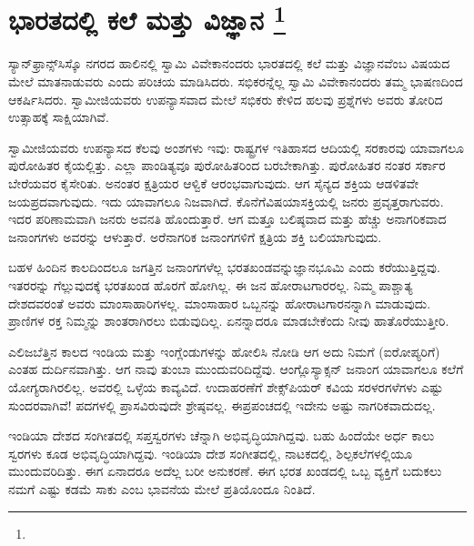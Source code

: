 
\chapter[ಭಾರತದಲ್ಲಿ ಕಲೆ ಮತ್ತು ವಿಜ್ಞಾನ ]{ಭಾರತದಲ್ಲಿ ಕಲೆ ಮತ್ತು ವಿಜ್ಞಾನ \protect\footnote{}}

ಸ್ಯಾನ್​ಫ್ರಾನ್ಸ್​ಸಿಸ್ಕೊ ನಗರದ ಹಾಲಿನಲ್ಲಿ ಸ್ವಾಮಿ ವಿವೇಕಾನಂದರು ಭಾರತದಲ್ಲಿ ಕಲೆ ಮತ್ತು ವಿಜ್ಞಾನವೆಂಬ ವಿಷಯದ ಮೇಲೆ ಮಾತನಾಡುವರು ಎಂದು ಪರಿಚಯ ಮಾಡಿಸಿದರು. ಸಭಿಕರನ್ನೆಲ್ಲ ಸ್ವಾಮಿ ವಿವೇಕಾನಂದರು ತಮ್ಮ ಭಾಷಣದಿಂದ ಆಕರ್ಷಿಸಿದರು. ಸ್ವಾಮೀಜಿಯವರು ಉಪನ್ಯಾಸವಾದ ಮೇಲೆ ಸಭಿಕರು ಕೇಳಿದ ಹಲವು ಪ್ರಶ್ನೆಗಳು ಅವರು ತೋರಿದ ಉತ್ಸಾಹಕ್ಕೆ ಸಾಕ್ಷಿಯಾಗಿವೆ.

ಸ್ವಾಮೀಜಿಯವರು ಉಪನ್ಯಾಸದ ಕೆಲವು ಅಂಶಗಳು ಇವು: ರಾಷ್ಟ್ರಗಳ ಇತಿಹಾಸದ ಆದಿಯಲ್ಲಿ ಸರಕಾರವು ಯಾವಾಗಲೂ ಪುರೋಹಿತರ ಕೈಯಲ್ಲಿತ್ತು. ಎಲ್ಲಾ ಪಾಂಡಿತ್ಯವೂ ಪುರೋಹಿತರಿಂದ ಬರಬೇಕಾಗಿತ್ತು. ಪುರೋಹಿತರ ನಂತರ ಸರ್ಕಾರ ಬೇರೆಯವರ ಕೈಸೇರಿತು. ಅನಂತರ ಕ್ಷತ್ರಿಯರ ಆಳ್ವಿಕೆ ಆರಂಭವಾಗುವುದು. ಆಗ ಸೈನ್ಯದ ಶಕ್ತಿಯ ಆಡಳಿತವೇ ಜಯಪ್ರದವಾಗುವುದು. ಇದು ಯಾವಾಗಲೂ ನಿಜವಾಗಿದೆ. ಕೊನೆಗೆ\break ವಿಷಯಾಸಕ್ತಿಯಲ್ಲಿ ಜನರು ಪ್ರವೃತ್ತರಾಗುವರು. ಇದರ ಪರಿಣಾಮವಾಗಿ ಜನರು ಅವನತಿ ಹೊಂದುತ್ತಾರೆ. ಆಗ ಮತ್ತೂ ಬಲಿಷ್ಠವಾದ ಮತ್ತು ಹೆಚ್ಚು ಅನಾಗರಿಕವಾದ ಜನಾಂಗಗಳು ಅವರನ್ನು ಆಳುತ್ತಾರೆ. ಅರೆನಾಗರಿಕ ಜನಾಂಗಗಳಿಗೆ ಕ್ಷತ್ರಿಯ ಶಕ್ತಿ ಬಲಿಯಾಗುವುದು.

ಬಹಳ ಹಿಂದಿನ ಕಾಲದಿಂದಲೂ ಜಗತ್ತಿನ ಜನಾಂಗಗಳೆಲ್ಲ ಭರತಖಂಡವನ್ನು\break ಜ್ಞಾನಭೂಮಿ ಎಂದು ಕರೆಯುತ್ತಿದ್ದವು. ಇತರರನ್ನು ಗೆಲ್ಲುವುದಕ್ಕೆ ಭರತಖಂಡ ಹೊರಗೆ ಹೋಗಿಲ್ಲ. ಈ ಜನ ಹೋರಾಟಗಾರರಲ್ಲ. ನಿಮ್ಮ ಪಾಶ್ಚಾತ್ಯ ದೇಶದವರಂತೆ ಅವರು ಮಾಂಸಾಹಾರಿಗಳಲ್ಲ. ಮಾಂಸಾಹಾರ ಒಬ್ಬನನ್ನು ಹೋರಾಟಗಾರನನ್ನಾಗಿ ಮಾಡುವುದು. ಪ್ರಾಣಿಗಳ ರಕ್ತ ನಿಮ್ಮನ್ನು ಶಾಂತರಾಗಿರಲು ಬಿಡುವುದಿಲ್ಲ. ಏನನ್ನಾದರೂ ಮಾಡಬೇಕೆಂದು ನೀವು ಹಾತೊರೆಯುತ್ತೀರಿ.

ಎಲಿಜಬೆತ್ತಿನ ಕಾಲದ ಇಂಡಿಯ ಮತ್ತು ಇಂಗ್ಲೆಂಡುಗಳನ್ನು ಹೋಲಿಸಿ ನೋಡಿ ಆಗ ಅದು ನಿಮಗೆ (ಐರೋಪ್ಯರಿಗೆ) ಎಂತಹ ದುರ್ದಿನವಾಗಿತ್ತು. ಆಗ ನಾವು ತುಂಬಾ ಮುಂದುವರಿದಿದ್ದೆವು. ಆಂಗ್ಲೊಸ್ಯಾಕ್ಸನ್​ ಜನಾಂಗ ಯಾವಾಗಲೂ ಕಲೆಗೆ ಯೋಗ್ಯರಾಗಿರಲಿಲ್ಲ. ಅವರಲ್ಲಿ ಒಳ್ಳೆಯ ಕಾವ್ಯವಿದೆ. ಉದಾಹರಣೆಗೆ ಶೇಕ್ಸ್​ಪಿಯರ್​ ಕವಿಯ ಸರಳ\break ರಗಳೆಗಳು ಎಷ್ಟು ಸುಂದರವಾಗಿವೆ! ಪದಗಳಲ್ಲಿ ಪ್ರಾಸವಿರುವುದೇ ಶ್ರೇಷ್ಠವಲ್ಲ. ಈ\break ಪ್ರಪಂಚದಲ್ಲಿ ಇದೇನು ಅಷ್ಟು ನಾಗರಿಕವಾದುದಲ್ಲ.

ಇಂಡಿಯಾ ದೇಶದ ಸಂಗೀತದಲ್ಲಿ ಸಪ್ತಸ್ವರಗಳು ಚೆನ್ನಾಗಿ ಅಭಿವೃದ್ಧಿಯಾಗಿದ್ದವು. ಬಹು ಹಿಂದೆಯೇ ಅರ್ಧ ಕಾಲು ಸ್ವರಗಳು ಕೂಡ ಅಭಿವೃದ್ಧಿಯಾಗಿದ್ದವು. ಇಂಡಿಯಾ ದೇಶ ಸಂಗೀತದಲ್ಲಿ, ನಾಟಕದಲ್ಲಿ, ಶಿಲ್ಪಕಲೆಗಳಲ್ಲಿಯೂ ಮುಂದುವರಿದಿತ್ತು. ಈಗ ಏನಾದರೂ ಅದೆಲ್ಲ ಬರೀ ಅನುಕರಣೆ. ಈಗ ಭರತ ಖಂಡದಲ್ಲಿ ಒಬ್ಬ ವ್ಯಕ್ತಿಗೆ ಬದುಕಲು ನಮಗೆ ಎಷ್ಟು ಕಡಮೆ ಸಾಕು ಎಂಬ ಭಾವನೆಯ ಮೇಲೆ ಪ್ರತಿಯೊಂದೂ ನಿಂತಿದೆ.

